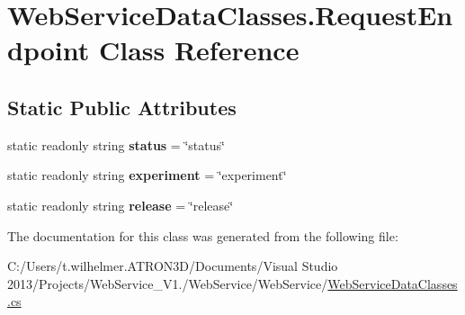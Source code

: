 \hypertarget{class_web_service_data_classes_1_1_request_endpoint}{}\section{Web\+Service\+Data\+Classes.\+Request\+Endpoint Class Reference}
\label{class_web_service_data_classes_1_1_request_endpoint}
\subsection*{Static Public Attributes}
\begin{DoxyCompactItemize}
\item 
\hypertarget{class_web_service_data_classes_1_1_request_endpoint_aaaa60163f6f1d4f509bb06dfe313d9b1}{}static readonly string {\bfseries status} = \char`\"{}status\char`\"{}\label{class_web_service_data_classes_1_1_request_endpoint_aaaa60163f6f1d4f509bb06dfe313d9b1}

\item 
\hypertarget{class_web_service_data_classes_1_1_request_endpoint_a05b85688e43ba1e1a424bd104b4d08e2}{}static readonly string {\bfseries experiment} = \char`\"{}experiment\char`\"{}\label{class_web_service_data_classes_1_1_request_endpoint_a05b85688e43ba1e1a424bd104b4d08e2}

\item 
\hypertarget{class_web_service_data_classes_1_1_request_endpoint_a6dd690471ad8b755714da20752cb5e54}{}static readonly string {\bfseries release} = \char`\"{}release\char`\"{}\label{class_web_service_data_classes_1_1_request_endpoint_a6dd690471ad8b755714da20752cb5e54}

\end{DoxyCompactItemize}


The documentation for this class was generated from the following file\+:\begin{DoxyCompactItemize}
\item 
C\+:/\+Users/t.\+wilhelmer.\+A\+T\+R\+O\+N3\+D/\+Documents/\+Visual Studio 2013/\+Projects/\+Web\+Service\+\_\+\+V1./\+Web\+Service/\+Web\+Service/\hyperlink{_web_service_data_classes_8cs}{Web\+Service\+Data\+Classes.\+cs}\end{DoxyCompactItemize}
